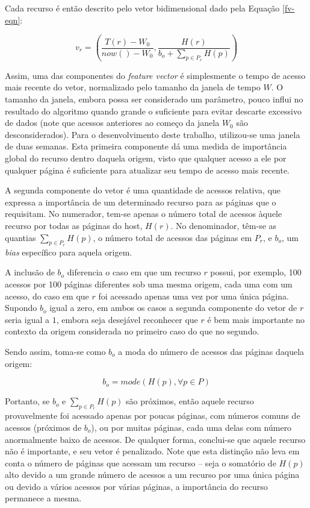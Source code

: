 \documentclass[10pt,twocolumn,letterpaper]{article}
\begin{document}
Cada recurso é então descrito pelo vetor bidimensional dado pela Equação \ref{fv-eqn}:

\begin{equation}
\label{fv-eqn}
v_{r} = \left( \frac{T(r) - W_0}{now() - W_0}, \frac{H(r)}{b_{o} + \sum_{p \in P_{r}} H(p)} \right)
\end{equation}

Assim, uma das componentes do \emph{feature vector} é simplesmente o tempo de acesso mais recente do vetor, normalizado pelo tamanho da janela de tempo $W$. O tamanho da janela, embora possa ser considerado um parâmetro, pouco influi no resultado do algoritmo quando grande o suficiente para evitar descarte excessivo de dados (note que acessos anteriores ao começo da janela $W_0$ são desconsiderados). Para o desenvolvimento deste trabalho, utilizou-se uma janela de duas semanas. Esta primeira componente dá uma medida de importância global do recurso dentro daquela origem, visto que qualquer acesso a ele por qualquer página é suficiente para atualizar seu tempo de acesso mais recente.

A segunda componente do vetor é uma quantidade de acessos relativa, que expressa a importância de um determinado recurso para as páginas que o requisitam. No numerador, tem-se apenas o número total de acessos àquele recurso por todas as páginas do host, $H(r)$. No denominador, têm-se as quantias $\sum_{p \in P_{r}} H(p)$, o número total de acessos das páginas em $P_{r}$, e $b_{o}$, um \emph{bias} específico para aquela origem.

A inclusão de $b_{o}$ diferencia o caso em que um recurso $r$ possui, por exemplo, 100 acessos por 100 páginas diferentes sob uma mesma origem, cada uma com um acesso, do caso em que $r$ foi acessado apenas uma vez por uma única página. Supondo $b_{o}$ igual a zero, em ambos os casos a segunda componente do vetor de $r$ seria igual a $1$, embora seja desejável reconhecer que $r$ é bem mais importante no contexto da origem considerada no primeiro caso do que no segundo.

Sendo assim, toma-se como $b_{o}$ a moda do número de acessos das páginas daquela origem:

\begin{equation}
b_{o} = mode(H(p), \forall p \in P)
\end{equation}

Portanto, se $b_{o}$ e $\sum_{p \in P_{r}} H(p)$ são próximos, então aquele recurso provavelmente foi acessado apenas por poucas páginas, com números comuns de acessos (próximos de $b_{o}$), ou por muitas páginas, cada uma delas com número anormalmente baixo de acessos. De qualquer forma, conclui-se que aquele recurso não é importante, e seu vetor é penalizado. Note que esta distinção não leva em conta o número de páginas que acessam um recurso -- seja o somatório de $H(p)$ alto devido a um grande número de acessos a um recurso por uma única página ou devido a vários acessos por várias páginas, a importância do recurso permanece a mesma.
\end{document}
